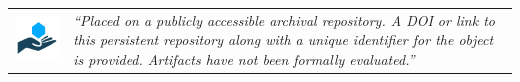 \vfill


\begin{table}[h!]
  \centering
  \begin{tabular}{  c  m{8.3cm}  }
    
    \begin{minipage}{.2\textwidth}
      \includegraphics[width=\linewidth]{kappa/img/Open_Research.png}
    \end{minipage}
    &
    \emph{``Placed on a publicly accessible archival repository. A DOI or link to this persistent repository along with a unique identifier for the object is provided. Artifacts have not been formally evaluated.''}
    \\[10mm]


\end{tabular}
\end{table}
